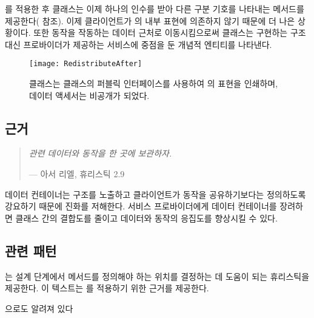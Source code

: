 \documentclass[a4paper,10pt,twoside]{book}
\begin{document}
를 적용한 후  클래스는 이제 하나의 인수를 받아 다른 구분 기호를 나타내는  메서드를 제공한다( 참조). 이제 클라이언트가 의 내부 표현에 의존하지 않기 때문에 더 나은 상황이다. 또한 동작을 작동하는 데이터 근처로 이동시킴으로써 클래스는 구현하는 구조 대신 프로바이더가 제공하는 서비스에 중점을 둔 개념적 엔티티를 나타낸다.

\begin{figure}
\begin{center}
\texttt{[image: RedistributeAfter]}
\caption{ 클래스는  클래스의 퍼블릭 인터페이스를 사용하여 의 표현을 인쇄하며, 데이터 액세서는 비공개가 되었다.}
\end{center}
\end{figure}


\subsection*{근거}

\begin{quotation}
\emph{관련 데이터와 동작을 한 곳에 보관하자.}

\hfill  --- 아서 리엘, 휴리스틱 2.9 \cite{Riel96a}
\end{quotation}

데이터 컨테이너는 구조를 노출하고 클라이언트가 동작을 공유하기보다는 정의하도록 강요하기 때문에 진화를 저해한다. 서비스 프로바이더에게 데이터 컨테이너를 장려하면 클래스 간의 결합도를 줄이고 데이터와 동작의 응집도를 향상시킬 수 있다.

\subsection*{관련 패턴}

는 설계 단계에서 메서드를 정의해야 하는 위치를 결정하는 데 도움이 되는 휴리스틱을 제공한다. 이 텍스트는 를 적용하기 위한 근거를 제공한다.


 \cite{Lieb88a}으로도 알려져 있다

\end{document}
